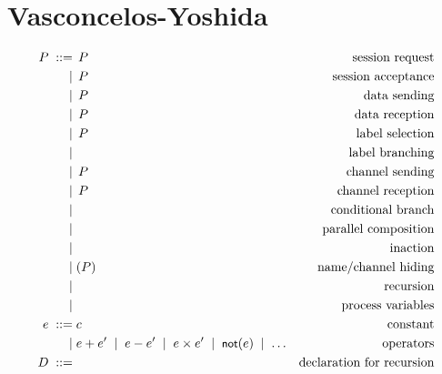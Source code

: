 \documentclass{article}
\begin{document}
\section{Vasconcelos-Yoshida}

\begin{align*}
  P \grmeq & \request akP                 & \text{session request}\\
    \grmor & \accept akP                  & \text{session acceptance}\\
    \grmor & \send keP                    & \text{data sending}\\
    \grmor & \recv kxP                    & \text{data reception}\\
    \grmor & \select klP                  & \text{label selection}\\
    \grmor & \branch klP                  & \text{label branching}\\
    \grmor & \hosend k{k'}P               & \text{channel sending}\\
    \grmor & \horecv k{k'}P               & \text{channel reception}\\
    \grmor & \cond ePQ                    & \text{conditional branch}\\
    \grmor & \parcomp PQ                  & \text{parallel composition}\\
    \grmor & \inact                       & \text{inaction}\\
    \grmor & \restrict uP                 & \text{name/channel hiding}\\
    \grmor & \recur DP                    & \text{recursion}\\
    \grmor & \vars X{\VEC e}{\VEC k}      & \text{process variables}\\
  e \grmeq & c                            & \text{constant}\\
    \grmor & e + e' \grmor e - e' \grmor e \times e' \grmor \notk(e) \grmor \dots
                                          & \text{operators}\\
  D \grmeq & \declare X{\VEC x}{\VEC k}P  & \text{declaration for recursion}\\
\end{align*}
\end{document}
